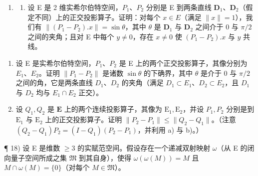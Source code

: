 \begin{enumerate}
\def\labelenumi{\arabic{enumi})}
\setcounter{enumi}{16}
\tightlist
\item
  \begin{enumerate}
  \def\labelenumii{\alph{enumii})}
  \tightlist
  \item
    设 E 是 2 维实希尔伯特空间，\(P_1\)、\(P_2\) 分别是 E 到两条直线 \(\mathbf{D}_1\)、\(\mathbf{D}_2\)（假定不同）上的正交投影算子。证明：对每个 \(x \in E\)（满足 \(\| x \| = 1\)），我们有 \(\| (P_1 - P_2).x \| = \sin \theta\)，其中 \(\theta\) 是 \(\mathbf{D}_1\) 与 \(\mathbf{D}_2\) 之间介于 0 与 \(\pi/2\) 之间的夹角；且对 E 中每个 \(y \neq 0\)，存在 \(x \neq 0\) 使 \((P_1 - P_2).x\) 与 \(y\) 共线。
  \end{enumerate}
\end{enumerate}

\begin{enumerate}
\def\labelenumi{\alph{enumi})}
\setcounter{enumi}{1}
\item
  设 E 是实希尔伯特空间，\(P_{1}\)、\(P_{2}\) 是 E 上的两个正交投影算子，其像分别为 \(E_{1}\)、\(E_{2}\)。证明 \(\|P_{1}-P_{2}\|\) 是诸数 \(\sin\theta\) 的下确界，其中 \(\theta\) 是介于 0 与 \(\pi/2\) 之间的角，它是两条直线 \(D_{1}\)、\(D_{2}\) 的夹角（满足 \(D_{1}\subset E_{1}\)、\(D_{2}\subset E_{2}\)，且 \(D_{1}\) 与 \(D_{2}\) 均与 \(E_{1}\cap E_{2}\) 正交）。
\item
  设 \(Q_{1}, Q_{2}\) 是 \(\mathbf{E}\) 上的两个连续投影算子，其像为 \(\mathrm{E}_1, \mathrm{E}_2\)，并设 \(P_{1}, P_{2}\) 分别是到 \(\mathrm{E}_1\) 与 \(\mathrm{E}_2\) 上的正交投影算子。证明 \(\| P_2 - P_1 \| \leqslant \| Q_2 - Q_1 \|\)。（注意 \((Q_2 - Q_1)P_2 = (I - Q_1)(P_2 - P_1)\)，并利用 a) 与 b)。）
\end{enumerate}

¶ 18) 设 E 是维数 \(\geqslant 3\) 的实赋范空间。假设存在一个递减双射映射 \(\omega\)（从 E 的闭向量子空间所成之集 \(\mathfrak{M}\) 到其自身），使得 \(\omega(\omega(M)) = M\) 且 \(M \cap \omega(M) = \{0\}\)（对每个 \(M \in \mathfrak{M}\)）。

